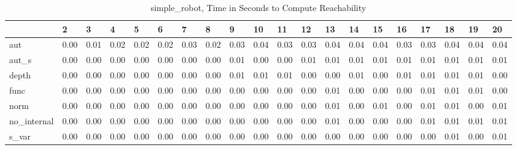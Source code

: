 \begin{table}
\centering
\caption{simple_robot, Time in Seconds to Compute Reachability}
\label{simple_robot_states_time}
\begin{tabular}{llllllllllllllllllll}
\toprule
{} &     2 &     3 &     4 &     5 &     6 &     7 &     8 &     9 &    10 &    11 &    12 &    13 &    14 &    15 &    16 &    17 &    18 &    19 &    20 \\
\midrule
aut         &  0.00 &  0.01 &  0.02 &  0.02 &  0.02 &  0.03 &  0.02 &  0.03 &  0.04 &  0.03 &  0.03 &  0.04 &  0.04 &  0.04 &  0.03 &  0.03 &  0.04 &  0.04 &  0.04 \\
aut\_s       &  0.00 &  0.00 &  0.00 &  0.00 &  0.00 &  0.00 &  0.00 &  0.01 &  0.00 &  0.00 &  0.01 &  0.01 &  0.01 &  0.01 &  0.01 &  0.01 &  0.01 &  0.01 &  0.01 \\
depth       &  0.00 &  0.00 &  0.00 &  0.00 &  0.00 &  0.00 &  0.00 &  0.01 &  0.01 &  0.01 &  0.00 &  0.00 &  0.01 &  0.00 &  0.01 &  0.01 &  0.01 &  0.01 &  0.00 \\
func        &  0.00 &  0.00 &  0.00 &  0.00 &  0.00 &  0.00 &  0.00 &  0.00 &  0.00 &  0.00 &  0.00 &  0.01 &  0.00 &  0.00 &  0.00 &  0.01 &  0.01 &  0.01 &  0.00 \\
norm        &  0.00 &  0.00 &  0.00 &  0.00 &  0.00 &  0.00 &  0.00 &  0.00 &  0.00 &  0.00 &  0.00 &  0.01 &  0.00 &  0.01 &  0.00 &  0.01 &  0.01 &  0.00 &  0.01 \\
no\_internal &  0.00 &  0.00 &  0.00 &  0.00 &  0.00 &  0.00 &  0.00 &  0.00 &  0.00 &  0.00 &  0.00 &  0.01 &  0.00 &  0.00 &  0.00 &  0.01 &  0.01 &  0.01 &  0.01 \\
s\_var       &  0.00 &  0.00 &  0.00 &  0.00 &  0.00 &  0.00 &  0.00 &  0.00 &  0.00 &  0.00 &  0.00 &  0.00 &  0.00 &  0.00 &  0.00 &  0.00 &  0.01 &  0.00 &  0.01 \\
\bottomrule
\end{tabular}
\end{table}
